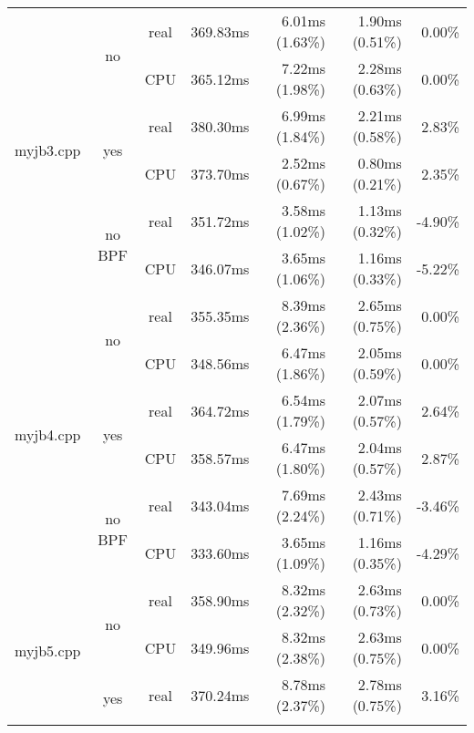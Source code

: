 \documentclass[en]{pracamgr}
\begin{document}
\begin{appendices}
\begin{small}
\begin{longtable}{|l|c|c|r|r|r|r|}
\hline
\multirow{6}{*}{myjb3.cpp}  & \multirow{2}{*}{no}     & real & 369.83ms & 6.01ms (1.63\%) & 1.90ms (0.51\%) & 0.00\% \\*
                            &                         & CPU  & 365.12ms & 7.22ms (1.98\%) & 2.28ms (0.63\%) & 0.00\% \\*
                            \cline{2-7}
                            & \multirow{2}{*}{yes}    & real & 380.30ms & 6.99ms (1.84\%) & 2.21ms (0.58\%) & 2.83\% \\*
                            &                         & CPU  & 373.70ms & 2.52ms (0.67\%) & 0.80ms (0.21\%) & 2.35\% \\*
                            \cline{2-7}
                            & \multirow{2}{*}{no BPF} & real & 351.72ms & 3.58ms (1.02\%) & 1.13ms (0.32\%) & -4.90\% \\*
                            &                         & CPU  & 346.07ms & 3.65ms (1.06\%) & 1.16ms (0.33\%) & -5.22\% \\
\hline
\multirow{6}{*}{myjb4.cpp}  & \multirow{2}{*}{no}     & real & 355.35ms & 8.39ms (2.36\%) & 2.65ms (0.75\%) & 0.00\% \\*
                            &                         & CPU  & 348.56ms & 6.47ms (1.86\%) & 2.05ms (0.59\%) & 0.00\% \\*
                            \cline{2-7}
                            & \multirow{2}{*}{yes}    & real & 364.72ms & 6.54ms (1.79\%) & 2.07ms (0.57\%) & 2.64\% \\*
                            &                         & CPU  & 358.57ms & 6.47ms (1.80\%) & 2.04ms (0.57\%) & 2.87\% \\*
                            \cline{2-7}
                            & \multirow{2}{*}{no BPF} & real & 343.04ms & 7.69ms (2.24\%) & 2.43ms (0.71\%) & -3.46\% \\*
                            &                         & CPU  & 333.60ms & 3.65ms (1.09\%) & 1.16ms (0.35\%) & -4.29\% \\
\hline
\multirow{6}{*}{myjb5.cpp}  & \multirow{2}{*}{no}     & real & 358.90ms & 8.32ms (2.32\%) & 2.63ms (0.73\%) & 0.00\% \\*
                            &                         & CPU  & 349.96ms & 8.32ms (2.38\%) & 2.63ms (0.75\%) & 0.00\% \\*
                            \cline{2-7}
                            & \multirow{2}{*}{yes}    & real & 370.24ms & 8.78ms (2.37\%) & 2.78ms (0.75\%) & 3.16\% \\*

\end{longtable}
\end{small}
\end{appendices}
\end{document}
